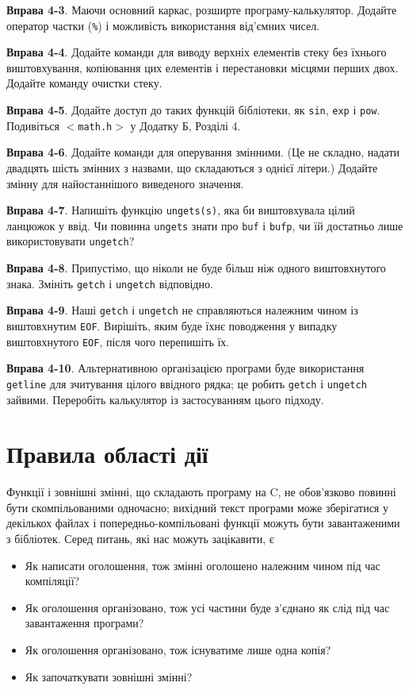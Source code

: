\documentclass[a4paper,12pt]{book}
\begin{document}
  \textbf{Вправа 4-3}. Маючи основний каркас, розширте програму-калькулятор. Додайте
  оператор частки (\texttt{\%}) і можливість використання від'ємних чисел.

  \textbf{Вправа 4-4}. Додайте команди для виводу верхніх елементів стеку без їхнього
  виштовхування, копіювання цих елементів і перестановки місцями перших двох. Додайте
  команду очистки стеку.

  \textbf{Вправа 4-5}. Додайте доступ до таких функцій бібліотеки, як \texttt{sin},
  \texttt{exp} і \texttt{pow}. Подивіться \texttt{\mbox{$<$}math.h\mbox{$>$}} у Додатку
  Б, Розділі 4.

  \textbf{Вправа 4-6}. Додайте команди для оперування змінними. (Це не складно, надати
  двадцять шість змінних з назвами, що складаються з однієї літери.) Додайте змінну для
  найостаннішого виведеного значення.

  \textbf{Вправа 4-7}. Напишіть функцію \texttt{ungets(s)}, яка би виштовхувала цілий
  ланцюжок у ввід. Чи повинна \texttt{ungets} знати про \texttt{buf} і \texttt{bufp}, чи
  їй достатньо лише використовувати \texttt{ungetch}?

  \textbf{Вправа 4-8}. Припустімо, що ніколи не буде більш ніж одного виштовхнутого знака.
  Змініть \texttt{getch} і \texttt{ungetch} відповідно.

  \textbf{Вправа 4-9}. Наші \texttt{getch} і \texttt{ungetch} не справляються належним чином
  із виштовхнутим \texttt{EOF}. Вирішіть, яким буде їхнє поводження у випадку виштовхнутого
  \texttt{EOF}, після чого перепишіть їх.

  \textbf{Вправа 4-10}. Альтернативною організацією програми буде використання
  \texttt{getline} для зчитування цілого ввідного рядка; це робить \texttt{getch} і
  \texttt{ungetch} зайвими. Переробіть калькулятор із застосуванням цього підходу.

\section{Правила області дії}


  Функції і зовнішні змінні, що складають програму на C, не обов'язково повинні
  бути скомпільованими одночасно; вихідний текст програми може зберігатися у декількох
  файлах і попередньо-компільовані функції можуть бути завантаженими з бібліотек. Серед
  питань, які нас можуть зацікавити, є
  \begin{itemize}    
    \item Як написати оголошення, тож змінні оголошено належним чином під час
    компіляції?
    \item Як оголошення організовано, тож усі частини буде з'єднано як слід під час
    завантаження програми?
    \item Як оголошення організовано, тож існуватиме лише одна копія?
    \item Як започаткувати зовнішні змінні?
  \end{itemize}
\end{document}
